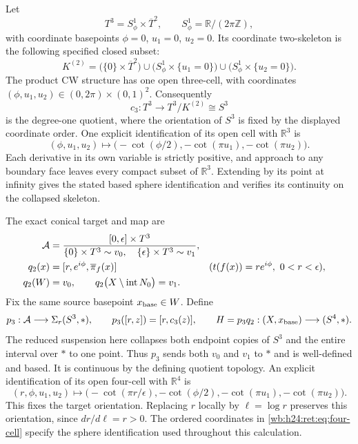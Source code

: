 Let
\[
 T^3=S^1_\phi\times\overline T^2,
 \qquad S^1_\phi=\mathbb R/(2\pi\mathbb Z),
\]
with coordinate basepoints \(\phi=0\), \(u_1=0\), \(u_2=0\).
Its coordinate two-skeleton is the following specified closed subset:
\begin{equation}
 K^{(2)}=
 \bigl(\{0\}\times\overline T^2\bigr)
 \cup\bigl(S^1_\phi\times\{u_1=0\}\bigr)
 \cup\bigl(S^1_\phi\times\{u_2=0\}\bigr).
 \label{wb:h24:ret:eq:two-skeleton}
\end{equation}
The product CW structure has one open three-cell, with coordinates
\((\phi,u_1,u_2)\in(0,2\pi)\times(0,1)^2\).  Consequently
\[
 c_3:T^3\longrightarrow T^3/K^{(2)}\cong S^3
\]
is the degree-one quotient, where the orientation of \(S^3\) is fixed
by the displayed coordinate order.  One explicit identification of its
open cell with \(\mathbb R^3\) is
\[
 (\phi,u_1,u_2)\longmapsto
 \bigl(-\cot(\phi/2),-\cot(\pi u_1),-\cot(\pi u_2)\bigr).
\]
Each derivative in its own variable is strictly positive, and approach
to any boundary face leaves every compact subset of \(\mathbb R^3\).
Extending by its point at infinity gives the stated based sphere
identification and verifies its continuity on the collapsed skeleton.

The exact conical target and map are
\begin{align}
 \mathcal A&=
 \frac{[0,\epsilon]\times T^3}
 {\{0\}\times T^3\sim v_0,\quad
  \{\epsilon\}\times T^3\sim v_1},
 \label{wb:h24:ret:eq:A-target}\\
 q_2(x)&=[r,e^{i\phi},\overline\pi_f(x)]
       &&(t(f(x))=re^{i\phi},\ 0<r<\epsilon),\notag\\
 q_2(W)&=v_0,\qquad
 q_2\bigl(X\setminus\operatorname{int}N_0\bigr)=v_1.
 \label{wb:h24:ret:eq:q2}
\end{align}
Fix the same source basepoint \(x_{\rm base}\in W\).  Define
\begin{equation}
 p_3:\mathcal A\longrightarrow\Sigma_r(S^3,*),\qquad
 p_3([r,z])=[r,c_3(z)],\qquad
 H=p_3q_2:(X,x_{\rm base})\longrightarrow(S^4,*).
 \label{wb:h24:ret:eq:H}
\end{equation}
The reduced suspension here collapses both endpoint copies of \(S^3\)
and the entire interval over \(*\) to one point.  Thus \(p_3\) sends
both \(v_0\) and \(v_1\) to \(*\) and is well-defined and based.
It is continuous by the defining quotient topology.  An explicit
identification of its open four-cell with \(\mathbb R^4\) is
\begin{equation}
 (r,\phi,u_1,u_2)\longmapsto
 \bigl(-\cot(\pi r/\epsilon),-\cot(\phi/2),
       -\cot(\pi u_1),-\cot(\pi u_2)\bigr).
 \label{wb:h24:ret:eq:four-cell}
\end{equation}
This fixes the target orientation.  Replacing \(r\) locally by
\(\ell=\log r\) preserves this orientation, since \(dr/d\ell=r>0\).
The ordered coordinates in \eqref{wb:h24:ret:eq:four-cell} specify the sphere
identification used throughout this calculation.

